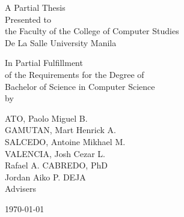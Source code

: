 %
%
%                 

\begin{titlepage}
\centering



\vspace{1.75cm}
A Partial Thesis\\
Presented to\\
the Faculty of the College of Computer Studies\\
De La Salle University Manila

\vspace{1.75cm}
In Partial Fulfillment\\
of the Requirements for the Degree of\\
Bachelor of Science in Computer Science\\
\vspace{1.75cm}
by\\
\vspace{1cm}

ATO, Paolo Miguel B.   \\
GAMUTAN, Mart Henrick A.  \\
SALCEDO, Antoine Mikhael M.   \\
VALENCIA, Josh Cezar L.   \\


\vspace{1.75cm}
Rafael A. CABREDO, PhD \\
Jordan Aiko P. DEJA \\
Advisers

\vspace{1.5cm}
\today
\end{titlepage}
